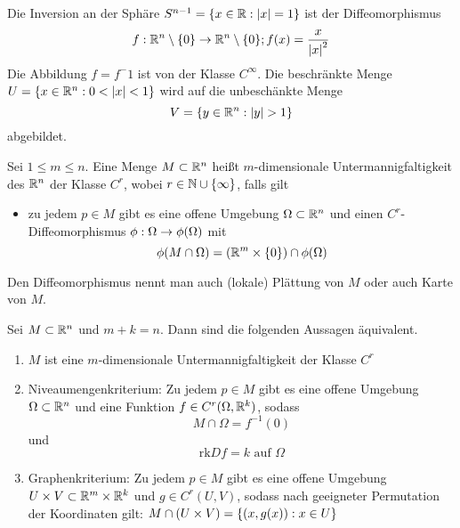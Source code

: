 \documentclass[../ana2u.tex]{subfiles}
\begin{document}
\begin{bsp}[Inversion]
    Die Inversion an der Sphäre \(S^{n-1} = \{x \in \mathbb{R} : \left|x\right| = 1\}\) ist der 
    Diffeomorphismus
    \[ f:\mathbb{R}^n\setminus \{0\}\rightarrow \mathbb{R}^n \setminus \{0\}; f(x) = \frac{x}{\left|x\right|^2} \]
    Die Abbildung \(f = f^-1\) ist von der Klasse \(C^\infty\). Die 
    beschränkte Menge \(U = \{x \in \mathbb{R}^n: 0 < \left|x\right| < 1\}\) wird auf die
    unbeschänkte Menge
    \[ V = \{y \in \mathbb{R}^n: \left|y\right| > 1\} \]
    abgebildet.
\end{bsp}
\begin{defi}
    Sei \(1 \leq m \leq n \). Eine Menge \( M \subset \mathbb{R}^n \) 
    heißt \(m\)-dimensionale Untermannigfaltigkeit des \(\mathbb{R}^n\) der 
    Klasse \( C^r \), wobei \( r \in \mathbb{N} \cup \{\infty\} \), falls gilt
    \begin{itemize}
        \item zu jedem \(p \in M\) gibt es eine offene Umgebung \(\Omega \subset \mathbb{R}^n\)
        und einen \(C^r\)-Diffeomorphismus \(\phi:\Omega\rightarrow \phi(\Omega)\) mit
        \[ \phi(M \cap \Omega) = (\mathbb{R}^m \times \{0\}) \cap \phi(\Omega) \]
    \end{itemize}
\end{defi}
\begin{bem}
    Den Diffeomorphismus nennt man auch (lokale) 
    Plättung von \( M \) oder auch Karte von \(M\).
\end{bem}
\begin{satz}[Untermannigfaltigkeitskriterium]
    Sei \( M \subset \mathbb{R}^n \) und \( m + k = n \). Dann 
    sind die folgenden Aussagen äquivalent.
    \begin{enumerate}
        \item \(M\) ist eine \(m\)-dimensionale Untermannigfaltigkeit der Klasse \(C^r\)
        \item Niveaumengenkriterium: Zu jedem \(p \in M\) gibt es eine offene
        Umgebung \(\Omega \subset \mathbb{R}^n\) und eine Funktion \(f \in C^r(\Omega, \mathbb{R}^k)\),
        sodass 
        \[ M \cap \Omega = f^{-1}(0) \]
        und 
        \[ \mathrm{rk} Df = k \text{ auf } \Omega \]
        \item Graphenkriterium: Zu jedem \(p \in M\) gibt es eine offene
        Umgebung \(U \times V \subset \mathbb{R}^m \times \mathbb{R}^k\) und
        \(g \in C^r(U, V)\), sodass nach geeigneter 
        Permutation der Koordinaten gilt:
        \(M \cap (U \times V) = \{(x, g(x)): x \in U\}\)
    \end{enumerate}
\end{satz}
\end{document}
